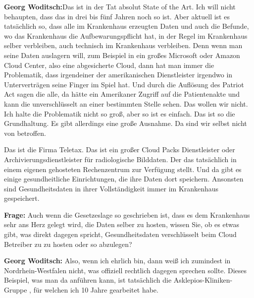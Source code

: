 \textbf{Georg Woditsch:}Das ist in der Tat absolut State of the Art. Ich will nicht behaupten, dass das in drei bis fünf Jahren noch so ist. Aber aktuell ist es tatsächlich so, dass alle im Krankenhaus erzeugten Daten und auch die Befunde, wo das Krankenhaus die Aufbewarungspflicht hat, in der Regel im Krankenhaus selber verbleiben, auch technisch im Krankenhaus verbleiben.
Denn wenn man seine Daten auslagern will, zum Beispiel in ein großes Microsoft oder Amazon Cloud Center, also eine abgesicherte Cloud, dann hat man immer die Problematik, dass irgendeiner der amerikanischen Dienstleister irgendwo in Unterverträgen seine Finger im Spiel hat. Und durch die Auflösung des Patriot Act sagen die alle, da hätte ein Amerikaner Zugriff auf die Patientenakte und kann die unverschlüsselt an einer bestimmten Stelle sehen. Das wollen wir nicht. Ich halte die Problematik nicht so groß, aber so ist es einfach. Das ist so die Grundhaltung. Es gibt allerdings eine große Ausnahme. Da sind wir selbst nicht von betroffen.

Das ist die Firma Teletax. Das ist ein großer Cloud Packs Dienstleister oder Archivierungsdienstleister für radiologische Bilddaten. Der das tatsächlich in einem eigenen gehosteten Rechenzentrum zur Verfügung stellt. Und da gibt es einige gesundheitliche Einrichtungen, die ihre Daten dort speichern. Ansonsten sind Gesundheitsdaten in ihrer Vollständigkeit immer im Krankenhaus gespeichert.

\textbf{Frage: }Auch wenn die Gesetzeslage so geschrieben ist, dass es dem Krankenhaus sehr ans Herz gelegt wird, die Daten selber zu hosten, wissen Sie, ob es etwas gibt, was direkt dagegen spricht, Gesundheitsdaten verschlüsselt beim Cloud Betreiber zu zu hosten oder so abzulegen?

\textbf{Georg Woditsch: }Also, wenn ich ehrlich bin, dann weiß ich zumindest in Nordrhein-Westfalen nicht, was offiziell rechtlich dagegen sprechen sollte. Dieses Beispiel, was man da anführen kann, ist tatsächlich die Asklepios-Kliniken-Gruppe , für welchen ich 10 Jahre gearbeitet habe.

